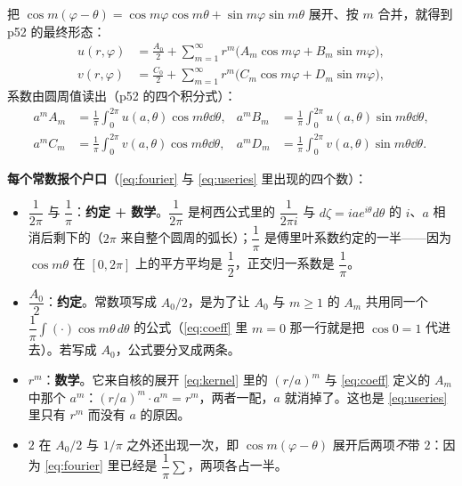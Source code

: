 把 $\cos m(\varphi-\theta)=\cos m\varphi\cos m\theta+\sin m\varphi\sin m\theta$ 展开、按 $m$ 合并，就得到 p52 的最终形态：
\begin{align}
u(r,\varphi)&=\frac{A_0}{2}+\sum_{m=1}^{\infty}r^{m}\bigl(A_m\cos m\varphi+B_m\sin m\varphi\bigr),\label{eq:useries}\\
v(r,\varphi)&=\frac{C_0}{2}+\sum_{m=1}^{\infty}r^{m}\bigl(C_m\cos m\varphi+D_m\sin m\varphi\bigr),\label{eq:vseries}
\end{align}
系数由圆周值读出（p52 的四个积分式）：
\begin{equation}\label{eq:coeff}
\begin{aligned}
a^{m}A_m&=\frac{1}{\pi}\int_0^{2\pi}u(a,\theta)\cos m\theta\dd\theta, &
a^{m}B_m&=\frac{1}{\pi}\int_0^{2\pi}u(a,\theta)\sin m\theta\dd\theta,\\
a^{m}C_m&=\frac{1}{\pi}\int_0^{2\pi}v(a,\theta)\cos m\theta\dd\theta, &
a^{m}D_m&=\frac{1}{\pi}\int_0^{2\pi}v(a,\theta)\sin m\theta\dd\theta .
\end{aligned}
\end{equation}

\begin{warnbox}
\noindent\textbf{每个常数报个户口}（\eqref{eq:fourier} 与 \eqref{eq:useries} 里出现的四个数）：

\begin{itemize}
\item $\dfrac{1}{2\pi}$ 与 $\dfrac{1}{\pi}$：\textbf{约定 + 数学}。$\dfrac{1}{2\pi}$ 是柯西公式里的 $\dfrac{1}{2\pi i}$ 与 $d\zeta=iae^{i\theta}d\theta$ 的 $i$、$a$ 相消后剩下的（$2\pi$ 来自整个圆周的弧长）；$\dfrac{1}{\pi}$ 是傅里叶系数约定的一半——因为 $\cos m\theta$ 在 $[0,2\pi]$ 上的平方平均是 $\dfrac12$，正交归一系数是 $\dfrac1\pi$。
\item $\dfrac{A_0}{2}$：\textbf{约定}。常数项写成 $A_0/2$，是为了让 $A_0$ 与 $m\ge1$ 的 $A_m$ 共用同一个 $\dfrac1\pi\int(\cdot)\cos m\theta\,d\theta$ 的公式（\eqref{eq:coeff} 里 $m=0$ 那一行就是把 $\cos0=1$ 代进去）。若写成 $A_0$，公式要分叉成两条。
\item $r^{m}$：\textbf{数学}。它来自核的展开 \eqref{eq:kernel} 里的 $(r/a)^{m}$ 与 \eqref{eq:coeff} 定义的 $A_m$ 中那个 $a^{m}$：$(r/a)^{m}\cdot a^{m}=r^{m}$，两者一配，$a$ 就消掉了。这也是 \eqref{eq:useries} 里只有 $r^{m}$ 而没有 $a$ 的原因。
\item $2$ 在 $A_0/2$ 与 $1/\pi$ 之外还出现一次，即 $\cos m(\varphi-\theta)$ 展开后两项\emph{不}带 $2$：因为 \eqref{eq:fourier} 里已经是 $\dfrac{1}{\pi}\sum$，两项各占一半。
\end{itemize}
\end{warnbox}

